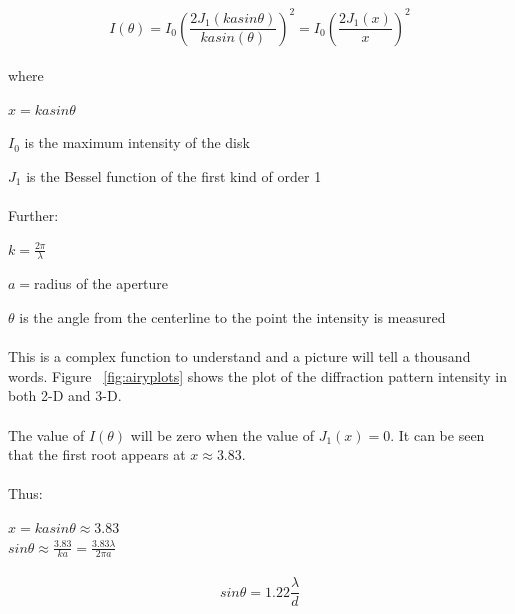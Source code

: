 \documentclass[11pt]{article}
\begin{document}
\begin{equation}
I(\theta) = I_{0}\left(\frac{2J_{1}(kasin\theta)}{kasin(\theta)}\right)^{2} = I_{0}\left(\frac{2J_{1}(x)}{x}\right)^{2}
\end{equation}

\paragraph{}
where 

$x = kasin\theta$

$I_{0}$ is the maximum intensity of the disk 

$J_{1}$ is the Bessel function of the first kind of order 1
\paragraph{}
Further:


$k=\frac{2\pi}{\lambda}$

$a=$radius of the aperture

$\theta$ is the angle from the centerline to the point the intensity is measured
\paragraph{}
This is a complex function to understand and a picture will tell a thousand words. Figure ~\ref{fig:airyplots} shows the plot of the diffraction pattern intensity in both 2-D and 3-D.
\paragraph{}

The value of $I(\theta)$ will be zero when the value of $J_{1}(x) = 0$.  It can be seen that the first root appears at $x\approx3.83$.
\paragraph{}
Thus:

$x = kasin\theta \approx 3.83$
\\

$sin\theta\approx\frac{3.83}{ka}=\frac{3.83\lambda}{2\pi a}$

\paragraph{}
\begin{equation}
sin\theta = 1.22\frac{\lambda}{d}
\end{equation}
\end{document}

